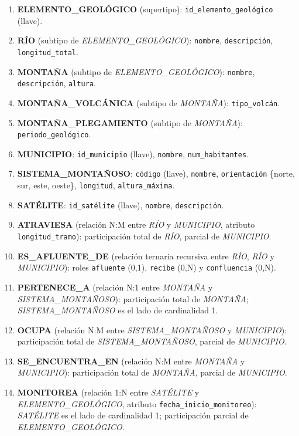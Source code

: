 \begin{enumerate}

  \item \textbf{ELEMENTO\_GEOLÓGICO} (supertipo): \texttt{id\_elemento\_geológico} (llave).
	\item \textbf{RÍO} (subtipo de \textit{ELEMENTO\_GEOLÓGICO}): \texttt{nombre}, \texttt{descripción}, \texttt{longitud\_total}.
	\item \textbf{MONTAÑA} (subtipo de \textit{ELEMENTO\_GEOLÓGICO}): \texttt{nombre}, \texttt{descripción}, \texttt{altura}.
	\item \textbf{MONTAÑA\_VOLCÁNICA} (subtipo de \textit{MONTAÑA}): \texttt{tipo\_volcán}.
	\item \textbf{MONTAÑA\_PLEGAMIENTO} (subtipo de \textit{MONTAÑA}): \texttt{periodo\_geológico}.
	\item \textbf{MUNICIPIO}: \texttt{id\_municipio} (llave), \texttt{nombre}, \texttt{num\_habitantes}.
	\item \textbf{SISTEMA\_MONTAÑOSO}: \texttt{código} (llave), \texttt{nombre}, \texttt{orientación} \{norte, sur, este, oeste\}, \texttt{longitud}, \texttt{altura\_máxima}.
	\item \textbf{SATÉLITE}: \texttt{id\_satélite} (llave), \texttt{nombre}, \texttt{descripción}.
	\item \textbf{ATRAVIESA} (relación N:M entre \textit{RÍO} y \textit{MUNICIPIO}, atributo \texttt{longitud\_tramo}): participación total de \textit{RÍO}, parcial de \textit{MUNICIPIO}.
	\item \textbf{ES\_AFLUENTE\_DE} (relación ternaria recursiva entre \textit{RÍO}, \textit{RÍO} y \textit{MUNICIPIO}): roles \texttt{afluente} (0,1), \texttt{recibe} (0,N) y \texttt{confluencia} (0,N).
	\item \textbf{PERTENECE\_A} (relación N:1 entre \textit{MONTAÑA} y \textit{SISTEMA\_MONTAÑOSO}): participación total de \textit{MONTAÑA}; \textit{SISTEMA\_MONTAÑOSO} es el lado de cardinalidad 1.
	\item \textbf{OCUPA} (relación N:M entre \textit{SISTEMA\_MONTAÑOSO} y \textit{MUNICIPIO}): participación total de \textit{SISTEMA\_MONTAÑOSO}, parcial de \textit{MUNICIPIO}.
	\item \textbf{SE\_ENCUENTRA\_EN} (relación N:M entre \textit{MONTAÑA} y \textit{MUNICIPIO}): participación total de \textit{MONTAÑA}, parcial de \textit{MUNICIPIO}.
	\item \textbf{MONITOREA} (relación 1:N entre \textit{SATÉLITE} y \textit{ELEMENTO\_GEOLÓGICO}, atributo \texttt{fecha\_inicio\_monitoreo}): \textit{SATÉLITE} es el lado de cardinalidad 1; participación parcial de \textit{ELEMENTO\_GEOLÓGICO}.

  
\end{enumerate}

